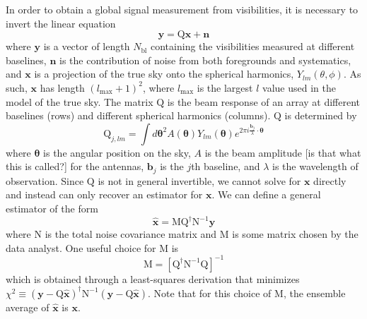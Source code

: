 \documentclass[twolcolumn,apj]{emulateapj}
\begin{document}
In order to obtain a global signal measurement from visibilities, it is necessary to invert the linear equation 
\begin{equation}
\mathbf{y} = \textrm{Q} \mathbf{x} + \mathbf{n}
\end{equation}
where $\mathbf{y}$ is a vector of length $N_{\textrm{bl}}$ containing the visibilities measured at different baselines, $\mathbf{n}$ is the contribution of noise from both foregrounds and systematics, and $\mathbf{x}$ is a projection of the true sky onto the spherical harmonics, $Y_{lm}(\theta,\phi)$. As such, $\mathbf{x}$ has length $(l_{\textrm{max}}+1)^2$, where $l_{\textrm{max}}$ is the largest $l$ value used in the model of the true sky. The matrix $\textrm{Q}$ is the beam response of an array at different baselines (rows) and different spherical harmonics (columns). $\textrm{Q}$ is determined by 
\begin{equation}
\textrm{Q}_{j,lm} = \int d \boldsymbol \theta^2 A(\boldsymbol \theta) Y_{lm}(\boldsymbol \theta) e^{2\pi i \frac{\mathbf{b_\textit{j}}}{\lambda} \cdot \boldsymbol \theta}
\end{equation}
where $\boldsymbol \theta$ is the angular position on the sky, $A$ is the beam amplitude [is that what this is called?] for the antennas, $\mathbf{b_{\textit{j}}}$ is the $j$th baseline, and $\lambda$ is the wavelength of observation. Since $\textrm{Q}$ is not in general invertible, we cannot solve for $\mathbf{x}$ directly and instead can only recover an estimator for $\mathbf{x}$. We can define a general estimator of the form 
\begin{equation}
\mathbf{\hat x} = \textrm{M} \textrm{Q}^\dagger \textrm{N}^{-1} \mathbf{y}
\end{equation}
where N is the total noise covariance matrix and M is some matrix chosen by the data analyst. One useful choice for M is 
\begin{equation}
\textrm{M} = [\textrm{Q}^\dagger \textrm{N}^{-1} \textrm{Q}]^{-1}
\label{eqn:M}
\end{equation}
which is obtained through a least-squares derivation that minimizes $\chi^2 \equiv (\mathbf{y}-\textrm{Q} \mathbf{\hat x})^\dagger \textrm{N}^{-1} (\mathbf{y}-\textrm{Q} \mathbf{\hat x})$. Note that for this choice of M, the ensemble average of $\mathbf{\hat x}$ is $\mathbf{x}$.
\end{document}
